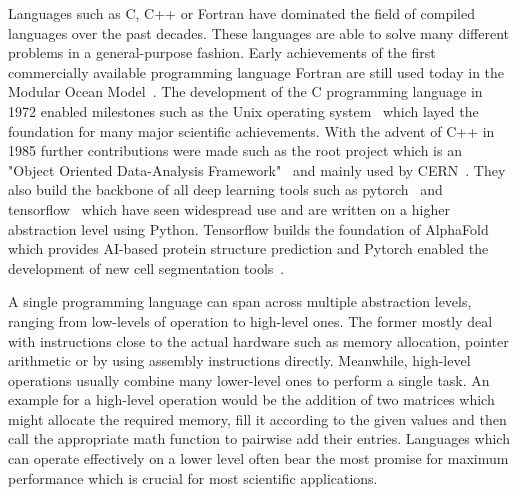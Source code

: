 \documentclass{article}
\begin{document}
Languages such as C, C++ or Fortran have dominated the field of compiled languages over the past
decades.
These languages are able to solve many different problems in a general-purpose fashion.
Early achievements of the first commercially available programming language Fortran are still used
today in the Modular Ocean Model~\cite{Adcroft2019,Griffies2012}.
The development of the C programming language in 1972 enabled milestones such as the Unix operating
system~ \cite{Ritchie1978} which layed the foundation for many major scientific achievements.
With the advent of C++ in 1985 further contributions were made such as the root project which
is an "Object Oriented Data-Analysis Framework"~\cite{Brun1997} and mainly used by
CERN~\cite{https://doi.org/10.7483/opendata.atlas.l806.5cku}.
They also build the backbone of all deep learning tools such as
pytorch~\cite{Ansel_PyTorch_2_Faster_2024} and tensorflow~\cite{tensorflow2015-whitepaper} which
have seen widespread use and are written on a higher abstraction level using Python.
Tensorflow builds the foundation of AlphaFold~\cite{Jumper2021} which provides AI-based protein
structure prediction and Pytorch enabled the development of new cell segmentation
tools~\cite{Cutler2022}.


A single programming language can span across multiple abstraction levels, ranging from low-levels
of operation to high-level ones.
The former mostly deal with instructions close to the actual hardware such as memory allocation,
pointer arithmetic or by using assembly instructions directly.
Meanwhile, high-level operations usually combine many lower-level ones to perform a single task.
An example for a high-level operation would be the addition of two matrices which might allocate the
required memory, fill it according to the given values and then call the appropriate math function
to pairwise add their entries.
Languages which can operate effectively on a lower level often bear the most promise for maximum
performance which is crucial for most scientific applications.
\end{document}
